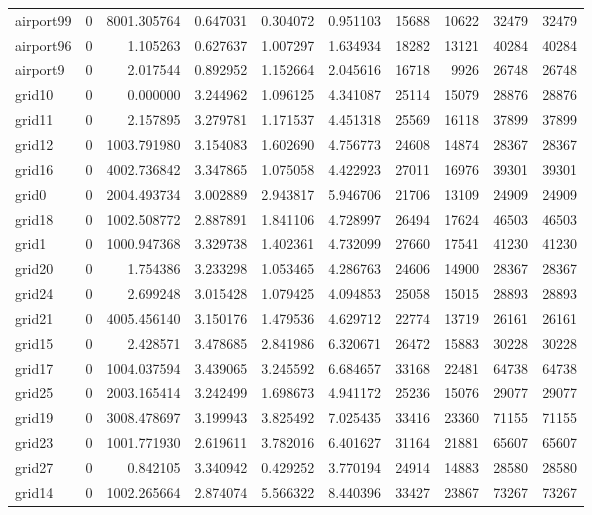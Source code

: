 \begin{longtable}{|l|r|r|r|r|r|r|r|r|r|}
airport99 & 0 & 8001.305764 & 0.647031 & 0.304072 & 0.951103 & 15688 & 10622 & 32479 & 32479 \\
airport96 & 0 & 1.105263 & 0.627637 & 1.007297 & 1.634934 & 18282 & 13121 & 40284 & 40284 \\
airport9 & 0 & 2.017544 & 0.892952 & 1.152664 & 2.045616 & 16718 & 9926 & 26748 & 26748 \\
grid10 & 0 & 0.000000 & 3.244962 & 1.096125 & 4.341087 & 25114 & 15079 & 28876 & 28876 \\
grid11 & 0 & 2.157895 & 3.279781 & 1.171537 & 4.451318 & 25569 & 16118 & 37899 & 37899 \\
grid12 & 0 & 1003.791980 & 3.154083 & 1.602690 & 4.756773 & 24608 & 14874 & 28367 & 28367 \\
grid16 & 0 & 4002.736842 & 3.347865 & 1.075058 & 4.422923 & 27011 & 16976 & 39301 & 39301 \\
grid0 & 0 & 2004.493734 & 3.002889 & 2.943817 & 5.946706 & 21706 & 13109 & 24909 & 24909 \\
grid18 & 0 & 1002.508772 & 2.887891 & 1.841106 & 4.728997 & 26494 & 17624 & 46503 & 46503 \\
grid1 & 0 & 1000.947368 & 3.329738 & 1.402361 & 4.732099 & 27660 & 17541 & 41230 & 41230 \\
grid20 & 0 & 1.754386 & 3.233298 & 1.053465 & 4.286763 & 24606 & 14900 & 28367 & 28367 \\
grid24 & 0 & 2.699248 & 3.015428 & 1.079425 & 4.094853 & 25058 & 15015 & 28893 & 28893 \\
grid21 & 0 & 4005.456140 & 3.150176 & 1.479536 & 4.629712 & 22774 & 13719 & 26161 & 26161 \\
grid15 & 0 & 2.428571 & 3.478685 & 2.841986 & 6.320671 & 26472 & 15883 & 30228 & 30228 \\
grid17 & 0 & 1004.037594 & 3.439065 & 3.245592 & 6.684657 & 33168 & 22481 & 64738 & 64738 \\
grid25 & 0 & 2003.165414 & 3.242499 & 1.698673 & 4.941172 & 25236 & 15076 & 29077 & 29077 \\
grid19 & 0 & 3008.478697 & 3.199943 & 3.825492 & 7.025435 & 33416 & 23360 & 71155 & 71155 \\
grid23 & 0 & 1001.771930 & 2.619611 & 3.782016 & 6.401627 & 31164 & 21881 & 65607 & 65607 \\
grid27 & 0 & 0.842105 & 3.340942 & 0.429252 & 3.770194 & 24914 & 14883 & 28580 & 28580 \\
grid14 & 0 & 1002.265664 & 2.874074 & 5.566322 & 8.440396 & 33427 & 23867 & 73267 & 73267 \\

\end{longtable}
